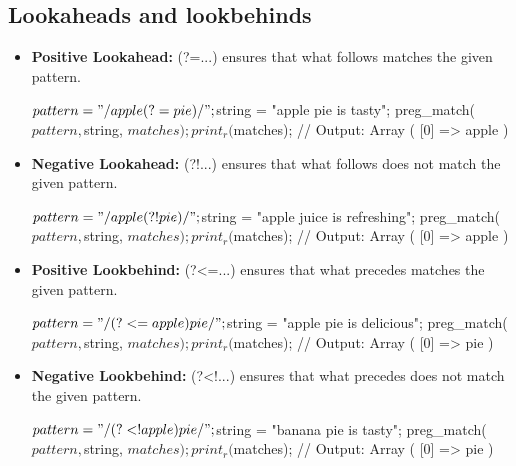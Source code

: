 \documentclass{report}
\begin{document}
\bigbreak \noindent 
\subsection{Lookaheads and lookbehinds}
\bigbreak \noindent 
\begin{itemize}
    \item \textbf{Positive Lookahead:} (?=...) ensures that what follows matches the given pattern.
        \bigbreak \noindent 
        \begin{phpcode}
            $pattern = "/apple(?= pie)/";
            $string = "apple pie is tasty";
            preg_match($pattern, $string, $matches);
            print_r($matches); // Output: Array ( [0] => apple )
        \end{phpcode}
    \item \textbf{Negative Lookahead:} (?!...) ensures that what follows does not match the given pattern.
        \bigbreak \noindent 
        \begin{phpcode}
            $pattern = "/apple(?! pie)/";
            $string = "apple juice is refreshing";
            preg_match($pattern, $string, $matches);
            print_r($matches); // Output: Array ( [0] => apple )
        \end{phpcode}
    \item \textbf{Positive Lookbehind:} (?<=...) ensures that what precedes matches the given pattern.
        \bigbreak \noindent 
        \begin{phpcode}
            $pattern = "/(?<=apple )pie/";
            $string = "apple pie is delicious";
            preg_match($pattern, $string, $matches);
            print_r($matches); // Output: Array ( [0] => pie )
        \end{phpcode}
    \item \textbf{Negative Lookbehind:} (?<!...) ensures that what precedes does not match the given pattern.
        \bigbreak \noindent 
        \begin{phpcode}
            $pattern = "/(?<!apple )pie/";
            $string = "banana pie is tasty";
            preg_match($pattern, $string, $matches);
            print_r($matches); // Output: Array ( [0] => pie )
        \end{phpcode}
\end{itemize}

\bigbreak \noindent 
\end{document}

